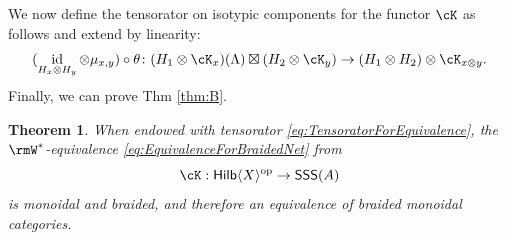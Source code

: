\documentclass[11pt,reqno]{amsart}
\DeclareMathOperator{\id}{id}
\newcommand{\Hilb}{\mathsf{Hilb}}
\numberwithin{equation}{section}
\theoremstyle{plain}
\newtheorem{theorem}[equation]{Theorem}
\theoremstyle{definition}
\begin{document}
We now define the tensorator on isotypic components for the functor $\cK$ as follows and extend by linearity:
\begin{equation}
\label{eq:TensoratorForEquivalence}
(\id_{H_x \otimes H_y}\otimes \mu_{x,y})\circ \theta \colon (H_1 \otimes \cK_x)(\Lambda)\boxtimes (H_2 \otimes \cK_y) \to (H_1 \otimes H_2) \otimes \cK_{x \otimes y}.
\end{equation}
Finally, we can prove Thm \ref{thm:B}.

\begin{theorem}
When endowed with tensorator \eqref{eq:TensoratorForEquivalence}, the $\rmW^*$-equivalence \eqref{eq:EquivalenceForBraidedNet} from \cite[Theorem~4.9]{2506.19969} 
\[
\cK: \Hilb\langle X\rangle^{\rm op} \to \mathsf{SSS}(A)
\]
is monoidal and braided, and therefore an equivalence of braided monoidal categories.
\end{theorem}
\end{document}
